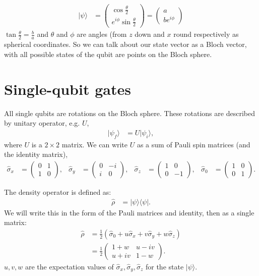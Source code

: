 \documentclass[a4paper, 11pt, normalem]{report}
\begin{document}
\begin{align}
    |\psi\rangle &= \begin{pmatrix}\cos\frac{\theta}{2} \\ e^{i\phi}\sin\frac{\theta}{2}\end{pmatrix} = \begin{pmatrix} a \\ be^{i\phi}\end{pmatrix}
\end{align}
$\tan\frac{\theta}{2} = \frac{b}{a}$ and $\theta$ and $\phi$ are angles (from $z$ down and $x$ round respectively as spherical coordinates.
So we can talk about our state vector as a Bloch vector, with all possible states of the qubit are points on the Bloch sphere.

\section{Single-qubit gates}
All single qubits are rotations on the Bloch sphere.
These rotations are described by unitary operator, e.g. $U$,
\begin{align}
    |\psi_f\rangle &= U|\psi_i\rangle,
\end{align}
where $U$ is a $2\times2$ matrix.
We can write $U$ as a sum of Pauli spin matrices (and the identity matrix),
\begin{align}
    \hat{\sigma}_x &= \begin{pmatrix}0&1\\1&0\end{pmatrix}, & \hat{\sigma}_y &= \begin{pmatrix}0&-i\\i&0\end{pmatrix}, & \hat{\sigma}_z &= \begin{pmatrix}1&0\\0&-1\end{pmatrix}, & \hat{\sigma}_0 &= \begin{pmatrix}1&0\\0&1\end{pmatrix}.
\end{align}

\begin{example}
    The density operator is defined as:
    \begin{align}
        \hat{\rho} &= |\psi\rangle\langle\psi|.
    \end{align}
    We will write this in the form of the Pauli matrices and identity, then as a single matrix:
    \begin{align}
        \hat{\rho} &= \frac12\left(\hat{\sigma}_0 + u\hat{\sigma}_x + v\hat{\sigma}_y + w\hat{\sigma}_z\right) \\
                   &= \frac12\begin{pmatrix} 1+w & u-iv \\ u+iv & 1-w\end{pmatrix}.
    \end{align}
    $u,v,w$ are the expectation values of $\hat{\sigma}_x,\hat{\sigma}_y,\hat{\sigma}_z$ for the state $|\psi\rangle$.
\end{example}
\end{document}
